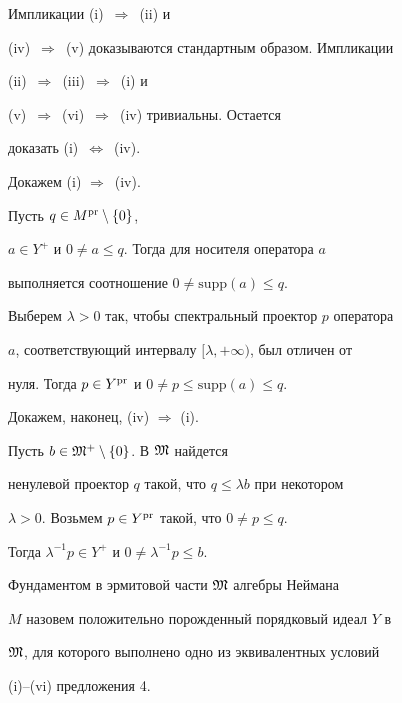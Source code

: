 \begin{pf}


Импликации (i)~$\Rightarrow$~(ii) и 


(iv)~$\Rightarrow$~(v) доказываются стандартным образом. Импликации 


(ii)~$\Rightarrow$~(iii)~$\Rightarrow$~(i) и 


(v)~$\Rightarrow$~(vi)~$\Rightarrow$~(iv) тривиальны. Остается 


доказать (i)~$\Leftrightarrow$~(iv).





Докажем (i) $\Rightarrow$~(iv). 


Пусть $q \in M^{\operatorname{pr}} \setminus \{0\}$, 


$a \in Y^+$ и $0 \ne a \le q$. Тогда для носителя оператора $a$ 


выполняется соотношение $0 \ne \text{supp} (a) \le q$. 


Выберем $\lambda > 0$ так, чтобы спектральный проектор $p$ оператора 


$a$, соответствующий интервалу $[\lambda, + \infty)$, был отличен от 


нуля. Тогда $p \in Y^{\operatorname{pr}}$ и $0 \ne p \le \text{supp} (a) \le q$.





Докажем, наконец, (iv) $\Rightarrow $ (i). 


Пусть $b \in {\frak M}^+ \setminus \{0\} $. В $\frak M$ найдется


ненулевой проектор $q$ такой, что $q \le \lambda b$ при некотором 


$\lambda > 0$. Возьмем $p \in Y^{\operatorname{pr}}$ такой, что $0 \ne p \le q$. 


Тогда $ \lambda^{-1} p \in Y^+$ и $0 \ne \lambda^{-1} p \le b$.


\end{pf}





\begin{defnnonum}


Фундаментом в эрмитовой части $\frak M$ алгебры Неймана 


$M$ назовем положительно порожденный порядковый идеал $Y$ в 


$\frak M$, для которого выполнено одно из эквивалентных условий


(i)--(vi) предложения 4.


\end{defnnonum}





